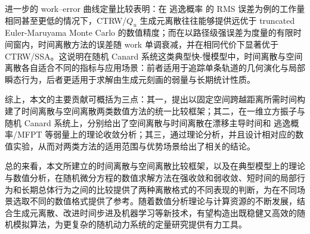 进一步的 work–error 曲线定量比较表明：在 逃逸概率 的 RMS 误差为例的工作量相同甚至更低的情况下，CTRW/\(Q_u\) 生成元离散往往能够提供远优于 truncated Euler-Maruyama Monte Carlo 的数值精度；而在以路径级强误差为度量的有限时间窗内，时间离散方法的误差随 work 单调衰减，并在相同代价下显著优于 CTRW/SSA。这说明在随机 Canard 系统这类典型快-慢模型中，时间离散与空间离散各自适合不同的指标与应用场景：前者适用于追踪单条轨道的几何演化与局部瞬态行为，后者更适用于求解由生成元刻画的弱量与长期统计性质。

综上，本文的主要贡献可概括为三点：其一，提出以固定空间跨越距离所需时间构建了时间离散与空间离散两类数值方法的统一比较框架；其二，在一维立方振子与随机 Canard 系统上，分别给出了空间离散与时间离散在漂移主导时间和 逃逸概率/MFPT 等弱量上的理论收敛分析；其三，通过理论分析，并且设计相对应的数值实验，从而对两类方法的适用范围与优势场景给出了相关的结论。


总的来看，本文所建立的时间离散与空间离散比较框架，以及在典型模型上的理论与数值分析，在随机微分方程的数值求解方法在强收敛和弱收敛、短时间的局部行为和长期总体行为之间的比较提供了两种离散格式的不同表现的判断，为在不同场景选取不同的数值格式提供了参考。随着数值分析理论与计算资源的不断发展，结合生成元离散、改进时间步进及机器学习等新技术，有望构造出既稳健又高效的随机模拟算法，为更复杂的随机动力系统的定量研究提供有力工具。




\newpage




